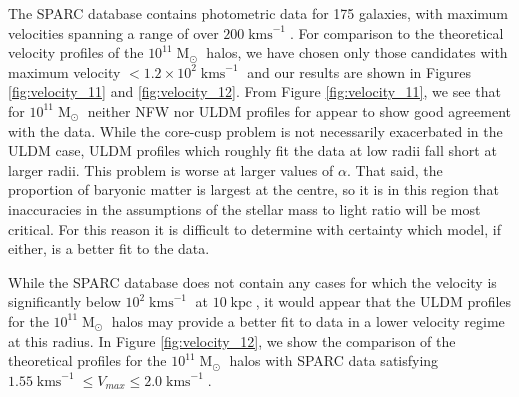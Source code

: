 \documentclass[a4paper,11pt]{article}
\begin{document}
The SPARC database contains photometric data for 175 galaxies, with maximum velocities spanning a range of over $200 \operatorname{kms}^{-1}$. For comparison to the theoretical velocity profiles of the $10^{11}\operatorname{M}_{\odot}$ halos, we have chosen only those candidates with maximum velocity $< 1.2\times 10^2 \operatorname{kms}^{-1}$ and our results are shown in Figures \ref{fig:velocity_11} and \ref{fig:velocity_12}. From Figure \ref{fig:velocity_11}, we see that for $10^{11}\operatorname{M}_{\odot}$  neither  NFW nor  ULDM profiles for appear to show good agreement with the data. While the core-cusp problem is not necessarily exacerbated in the ULDM case, ULDM profiles which roughly fit the data at low radii fall short at larger radii. This problem is worse at larger values of $\alpha$. That said, the proportion of baryonic matter is largest at the centre, so it is in this region that inaccuracies in the assumptions of the stellar mass to light ratio will be most critical.  For this reason it is difficult to determine with certainty which model, if either, is a better fit to the data.

While the SPARC database does not contain any cases for which the velocity is significantly below $10^2\operatorname{kms}^{-1}$ at $10 \operatorname{kpc}$, it would appear that the ULDM profiles for the $10^{11}\operatorname{M}_{\odot}$ halos may provide a better fit to data in a lower velocity regime at this radius.  In Figure \ref{fig:velocity_12}, we show the comparison of the theoretical profiles for the $10^{11}\operatorname{M}_{\odot}$ halos with SPARC data satisfying $1.55 \operatorname{kms}^{-1}\leq V_{max}\leq 2.0 \operatorname{kms}^{-1}$.
\end{document}
